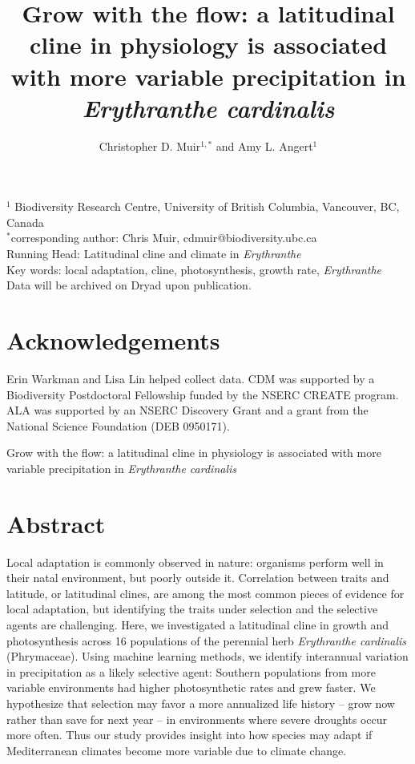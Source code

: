 \documentclass[11pt, oneside]{article}
\title{Grow with the flow: a latitudinal cline in physiology is associated with more variable precipitation in \textit{Erythranthe cardinalis}}
\author{Christopher D. Muir$^{1,*}$ and Amy L. Angert$^1$}
\date{}
\newcommand{\stretchy}{1.5}
\begin{document}

\maketitle

$^1$ Biodiversity Research Centre, University of British Columbia, Vancouver, BC, Canada \\
$^*$corresponding author: Chris Muir, cdmuir@biodiversity.ubc.ca \\

Running Head: Latitudinal cline and climate in \textit{Erythranthe} \\

Key words: local adaptation, cline, photosynthesis, growth rate, \textit{Erythranthe} \\

Data will be archived on Dryad upon publication. \\


\section*{Acknowledgements}
Erin Warkman and Lisa Lin helped collect data. CDM was supported by a Biodiversity Postdoctoral Fellowship funded by the NSERC CREATE program. ALA was supported by an NSERC Discovery Grant and a grant from the National Science Foundation (DEB 0950171).

\clearpage

\setstretch{\stretchy}

\begin{center}
{\LARGE  \centering Grow with the flow: a latitudinal cline in physiology is associated with more variable precipitation in \textit{Erythranthe cardinalis}}
\end{center}

\section*{Abstract}

Local adaptation is commonly observed in nature: organisms perform well in their natal environment, but poorly outside it. Correlation between traits and latitude, or latitudinal clines, are among the most common pieces of evidence for local adaptation, but identifying the traits under selection and the selective agents are challenging. Here, we investigated a latitudinal cline in growth and photosynthesis across 16 populations of the perennial herb \textit{Erythranthe cardinalis} (Phrymaceae). Using machine learning methods, we identify interannual variation in precipitation as a likely selective agent: Southern populations from more variable environments had higher photosynthetic rates and grew faster. We hypothesize that selection may favor a more annualized life history -- grow now rather than save for next year -- in environments where severe droughts occur more often. Thus our study provides insight into how species may adapt if Mediterranean climates become more variable due to climate change.
\end{document}
